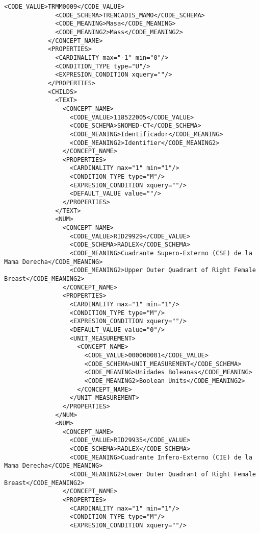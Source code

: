 \begin{lstlisting}[label=some-code,caption=Some Code]
              <CODE_VALUE>TRMM0009</CODE_VALUE>
              <CODE_SCHEMA>TRENCADIS_MAMO</CODE_SCHEMA>
              <CODE_MEANING>Masa</CODE_MEANING>
              <CODE_MEANING2>Mass</CODE_MEANING2>
            </CONCEPT_NAME>
            <PROPERTIES>
              <CARDINALITY max="-1" min="0"/>
              <CONDITION_TYPE type="U"/>
              <EXPRESION_CONDITION xquery=""/>
            </PROPERTIES>
            <CHILDS>
              <TEXT>
                <CONCEPT_NAME>
                  <CODE_VALUE>118522005</CODE_VALUE>
                  <CODE_SCHEMA>SNOMED-CT</CODE_SCHEMA>
                  <CODE_MEANING>Identificador</CODE_MEANING>
                  <CODE_MEANING2>Identifier</CODE_MEANING2>
                </CONCEPT_NAME>
                <PROPERTIES>
                  <CARDINALITY max="1" min="1"/>
                  <CONDITION_TYPE type="M"/>
                  <EXPRESION_CONDITION xquery=""/>
                  <DEFAULT_VALUE value=""/>
                </PROPERTIES>
              </TEXT>
              <NUM>
                <CONCEPT_NAME>
                  <CODE_VALUE>RID29929</CODE_VALUE>
                  <CODE_SCHEMA>RADLEX</CODE_SCHEMA>
                  <CODE_MEANING>Cuadrante Supero-Externo (CSE) de la Mama Derecha</CODE_MEANING>
                  <CODE_MEANING2>Upper Outer Quadrant of Right Female Breast</CODE_MEANING2>
                </CONCEPT_NAME>
                <PROPERTIES>
                  <CARDINALITY max="1" min="1"/>
                  <CONDITION_TYPE type="M"/>
                  <EXPRESION_CONDITION xquery=""/>
                  <DEFAULT_VALUE value="0"/>
                  <UNIT_MEASUREMENT>
                    <CONCEPT_NAME>
                      <CODE_VALUE>000000001</CODE_VALUE>
                      <CODE_SCHEMA>UNIT_MEASUREMENT</CODE_SCHEMA>
                      <CODE_MEANING>Unidades Boleanas</CODE_MEANING>
                      <CODE_MEANING2>Boolean Units</CODE_MEANING2>
                    </CONCEPT_NAME>
                  </UNIT_MEASUREMENT>
                </PROPERTIES>
              </NUM>
              <NUM>
                <CONCEPT_NAME>
                  <CODE_VALUE>RID29935</CODE_VALUE>
                  <CODE_SCHEMA>RADLEX</CODE_SCHEMA>
                  <CODE_MEANING>Cuadrante Infero-Externo (CIE) de la Mama Derecha</CODE_MEANING>
                  <CODE_MEANING2>Lower Outer Quadrant of Right Female Breast</CODE_MEANING2>
                </CONCEPT_NAME>
                <PROPERTIES>
                  <CARDINALITY max="1" min="1"/>
                  <CONDITION_TYPE type="M"/>
                  <EXPRESION_CONDITION xquery=""/>

\end{lstlisting}
